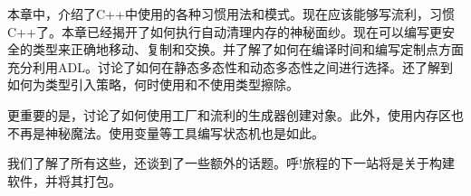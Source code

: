 本章中，介绍了C++中使用的各种习惯用法和模式。现在应该能够写流利，习惯C++了。本章已经揭开了如何执行自动清理内存的神秘面纱。现在可以编写更安全的类型来正确地移动、复制和交换。并了解了如何在编译时间和编写定制点方面充分利用ADL。讨论了如何在静态多态性和动态多态性之间进行选择。还了解到如何为类型引入策略，何时使用和不使用类型擦除。

更重要的是，讨论了如何使用工厂和流利的生成器创建对象。此外，使用内存区也不再是神秘魔法。使用变量等工具编写状态机也是如此。

我们了解了所有这些，还谈到了一些额外的话题。呼!旅程的下一站将是关于构建软件，并将其打包。